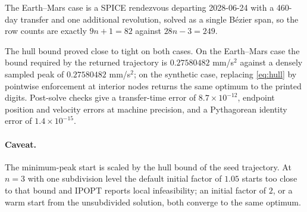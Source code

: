 \documentclass[11pt]{article}
\begin{document}
The Earth--Mars case is a SPICE rendezvous departing 2028-06-24 with a 460-day
transfer and one additional revolution, solved as a single B\'ezier span, so the
row counts are exactly $9n+1=82$ against $28n-3=249$.

The hull bound proved close to tight on both cases. On the Earth--Mars case the
bound required by the returned trajectory is $0.27580482$ mm/s$^2$ against a
densely sampled peak of $0.27580482$ mm/s$^2$; on the synthetic case, replacing
\eqref{eq:hull} by pointwise enforcement at interior nodes returns the same
optimum to the printed digits. Post-solve checks give a transfer-time error of
$8.7\times10^{-12}$, endpoint position and velocity errors at machine precision,
and a Pythagorean identity error of $1.4\times10^{-15}$.

\paragraph{Caveat.} The minimum-peak start is scaled by the hull bound of the
seed trajectory. At $n=3$ with one subdivision level the default initial factor
of $1.05$ starts too close to that bound and IPOPT reports local infeasibility;
an initial factor of $2$, or a warm start from the unsubdivided solution, both
converge to the same optimum.
\end{document}
